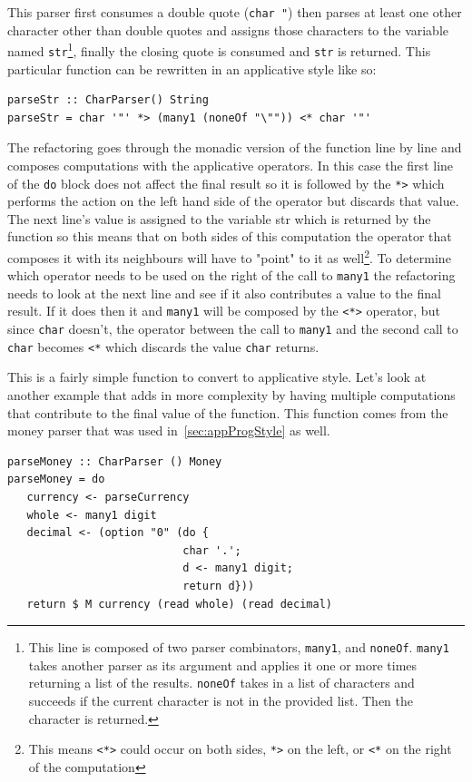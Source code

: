 This parser first consumes a double quote (\texttt{char \textquotesingle"\textquotesingle}) then parses at least one other character other than double quotes and assigns those characters to the variable named \texttt{str}\footnote{This line is composed of two parser combinators, \texttt{many1}, and \texttt{noneOf}. \texttt{many1} takes another parser as its argument and applies it one or more times returning a list of the results. \texttt{noneOf} takes in a list of characters and succeeds if the current character is not in the provided list. Then the character is returned.}, finally the closing quote is consumed and \texttt{str} is returned. This particular function can be rewritten in an applicative style like so:

\begin{lstlisting}[frame=tlrb]
parseStr :: CharParser() String
parseStr = char '"' *> (many1 (noneOf "\"")) <* char '"'
\end{lstlisting}

The refactoring goes through the monadic version of the function line by line and composes computations with the applicative operators. In this case the first line of the \texttt{do} block does not affect the final result so it is followed by the \texttt{*>} which performs the action on the left hand side of the operator but discards that value. The next line's value is assigned to the variable str which is returned by the function so this means that on both sides of this computation the operator that composes it with its neighbours will have to "point" to it as well\footnote{This means \texttt{<*>} could occur on both sides, \texttt{*>} on the left, or \texttt{<*} on the right of the computation}. To determine which operator needs to be used on the right of the call to \texttt{many1} the refactoring needs to look at the next line and see if it also contributes a value to the final result. If it does then it and \texttt{many1} will be composed by the \texttt{<*>} operator, but since \texttt{char} doesn't, the operator between the call to \texttt{many1} and the second call to \texttt{char} becomes \texttt{<*} which discards the value \texttt{char} returns.

This is a fairly simple function to convert to applicative style. Let's look at another example that adds in more complexity by having multiple computations that contribute to the final value of the function. This function comes from the money parser that was used in~\ref{sec:appProgStyle} as well. 
\pagebreak
\begin{lstlisting}[frame=tlrb]
parseMoney :: CharParser () Money
parseMoney = do
   currency <- parseCurrency 
   whole <- many1 digit
   decimal <- (option "0" (do { 
                           char '.';
                           d <- many1 digit;
                           return d}))
   return $ M currency (read whole) (read decimal)
\end{lstlisting}

